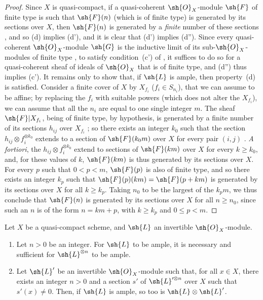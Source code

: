 \begin{proof}
Since $X$ is quasi-compact, if a quasi-coherent $\sh{O}_X$-module $\sh{F}$ of finite type is such that $\sh{F}(n)$ (which is of finite type) is generated by its sections over $X$, then $\sh{F}(n)$ is generated by a \emph{finite} number of these sections , and so (d) implies (d'), and it is clear that (d') implies (d'').
Since every quasi-coherent $\sh{O}_X$-module $\sh{G}$ is the inductive limit of its sub-$\sh{O}_X$-modules of finite type , to satisfy condition~(c') of , it suffices to do so for a quasi-coherent sheaf of ideals of $\sh{O}_X$ that is of finite type, and (d'') thus implies (c').
It remains only to show that, if $\sh{L}$ is ample, then property~(d) is satisfied.
Consider a finite cover of $X$ by $X_{f_i}$ ($f_i\in S_{n_i}$), that we can assume to be affine;
by replacing the $f_i$ with suitable powers (which does not alter the $X_{f_i}$), we can assume that all the $n_i$ are equal to one single integer $m$.
The sheaf $\sh{F}|X_{f_i}$, being of finite type, by hypothesis, is generated by a finite number of its sections $h_{ij}$ over $X_{f_i}$ ;
so there exists an integer $k_0$ such that the section $h_{ij}\otimes f_i^{\otimes k_0}$ extends to a section of $\sh{F}(k_0m)$ over $X$ for every pair $(i,j)$ .
\emph{A fortiori}, the $h_{ij}\otimes f_i^{\otimes k_0}$ extend to sections of $\sh{F}(km)$ over $X$ for every $k\geq k_0$, and, for these values of $k$, $\sh{F}(km)$ is thus generated by its sections over $X$.
For every $p$ such that $0<p<m$, $\sh{F}(p)$ is also of finite type, and so there exists an integer $k_p$ such that $\sh{F}(p)(km)=\sh{F}(p+km)$ is generated by its sections over $X$ for all $k\geq k_p$.
Taking $n_0$ to be the largest of the $k_pm$, we thus conclude that $\sh{F}(n)$ is generated by its sections over $X$ for all $n\geq n_0$, since such an $n$ is of the form $n=km+p$, with $k\geq k_p$ and $0\leq p<m$.
\end{proof}

\begin{proposition}[4.5.6]
\label{II.4.5.6}
  Let $X$ be a quasi-compact scheme, and $\sh{L}$ an invertible $\sh{O}_X$-module.
  \begin{enumerate}
    \item[\rm{(i)}] Let $n>0$ be an integer. For $\sh{L}$ to be ample, it is necessary and sufficient for $\sh{L}^{\otimes n}$ to be ample.
    \item[\rm{(ii)}] Let $\sh{L}'$ be an invertible $\sh{O}_X$-module such that, for all $x\in X$, there exists an integer $n>0$
      and a section $s'$ of $\sh{L}'^{\otimes n}$ over $X$ such that $s'(x)\neq0$.
      Then, if $\sh{L}$ is ample, so too is $\sh{L}\otimes\sh{L}'$.
  \end{enumerate}
\end{proposition}

